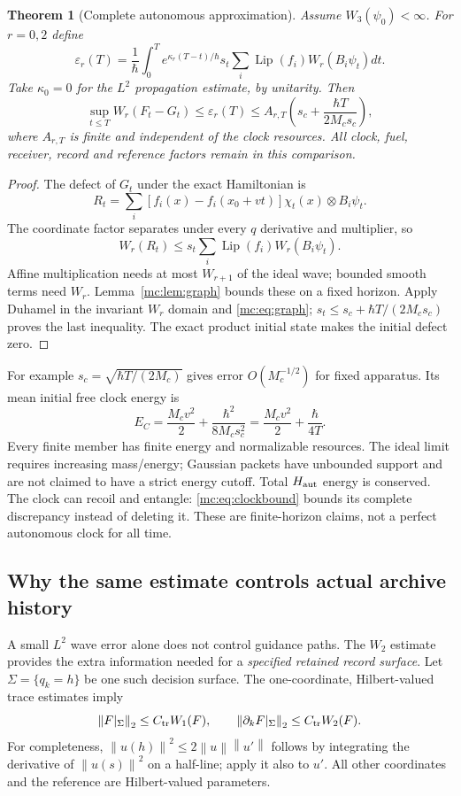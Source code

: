 \documentclass[11pt,oneside,openany]{book}
\newtheorem{theorem}{Theorem}[chapter]
\theoremstyle{definition}
\theoremstyle{remark}\newtheorem{remark}[theorem]{Remark}
\providecommand{\norm}[1]{\left\lVert#1\right\rVert}
\begin{document}
\begin{theorem}[Complete autonomous approximation]\label{mc:thm:clock}
Assume $W_3(\psi_0)<\infty$. For $r=0,2$ define
\begin{equation}\label{mc:eq:epsclock}
 \varepsilon_r(T)=\frac1\hbar\int_0^T e^{\kappa_r(T-t)/\hbar}s_t
                         \sum_i\operatorname{Lip}(f_i)W_r(B_i\psi_t)dt.
\end{equation}
Take $\kappa_0=0$ for the $L^2$ propagation estimate, by unitarity. Then
\begin{equation}\label{mc:eq:clockbound}
 \sup_{t\le T}W_r(F_t-G_t)\le\varepsilon_r(T)
 \le A_{r,T}\left(s_c+\frac{\hbar T}{2M_cs_c}\right),
\end{equation}
where $A_{r,T}$ is finite and independent of the clock resources. All clock, fuel, receiver, record and reference factors remain in this comparison.
\end{theorem}
\begin{proof}
The defect of $G_t$ under the exact Hamiltonian is
\[
 R_t=\sum_i[f_i(x)-f_i(x_0+vt)]\chi_t(x)\otimes B_i\psi_t.
\]
The coordinate factor separates under every $q$ derivative and multiplier, so
\[
 W_r(R_t)\le s_t\sum_i\operatorname{Lip}(f_i)W_r(B_i\psi_t).
\]
Affine multiplication needs at most $W_{r+1}$ of the ideal wave; bounded smooth terms need $W_r$. Lemma~\ref{mc:lem:graph} bounds these on a fixed horizon. Apply Duhamel in the invariant $W_r$ domain and \eqref{mc:eq:graph}; $s_t\le s_c+\hbar T/(2M_cs_c)$ proves the last inequality. The exact product initial state makes the initial defect zero.
\end{proof}
For example $s_c=\sqrt{\hbar T/(2M_c)}$ gives error $O(M_c^{-1/2})$ for fixed apparatus. Its mean initial free clock energy is
\begin{equation}\label{mc:eq:clockenergy}
 E_C=\frac{M_cv^2}{2}+\frac{\hbar^2}{8M_cs_c^2}
     =\frac{M_cv^2}{2}+\frac{\hbar}{4T}.
\end{equation}
Every finite member has finite energy and normalizable resources. The ideal limit requires increasing mass/energy; Gaussian packets have unbounded support and are not claimed to have a strict energy cutoff. Total $H_{\rm aut}$ energy is conserved. The clock can recoil and entangle: \eqref{mc:eq:clockbound} bounds its complete discrepancy instead of deleting it. These are finite-horizon claims, not a perfect autonomous clock for all time.

\subsection{Why the same estimate controls actual archive history}
A small $L^2$ wave error alone does not control guidance paths. The $W_2$ estimate provides the extra information needed for a \emph{specified retained record surface}. Let $\Sigma=\{q_k=h\}$ be one such decision surface. The one-coordinate, Hilbert-valued trace estimates imply
\[
 \norm{F|_\Sigma}_2\le C_{\rm tr}W_1(F),\qquad
 \norm{\partial_kF|_\Sigma}_2\le C_{\rm tr}W_2(F).
\]
For completeness, $\norm{u(h)}^2\le2\norm u\norm{u'}$ follows by integrating the derivative of $\norm{u(s)}^2$ on a half-line; apply it also to $u'$. All other coordinates and the reference are Hilbert-valued parameters.
\end{document}
